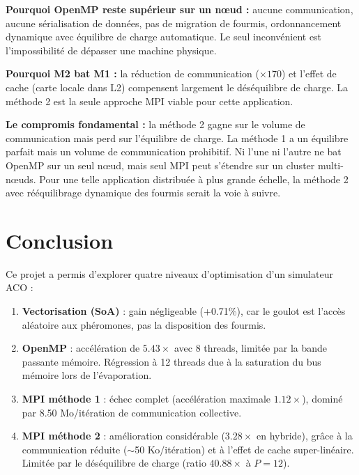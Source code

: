 \documentclass[11pt,a4paper]{article}
\begin{document}
\textbf{Pourquoi OpenMP reste supérieur sur un nœud :} aucune communication, aucune sérialisation de données, pas de migration de fourmis, ordonnancement dynamique avec équilibre de charge automatique. Le seul inconvénient est l'impossibilité de dépasser une machine physique.

\textbf{Pourquoi M2 bat M1 :} la réduction de communication ($\times 170$) et l'effet de cache (carte locale dans L2) compensent largement le déséquilibre de charge. La méthode 2 est la seule approche MPI viable pour cette application.

\textbf{Le compromis fondamental :} la méthode 2 gagne sur le volume de communication mais perd sur l'équilibre de charge. La méthode 1 a un équilibre parfait mais un volume de communication prohibitif. Ni l'une ni l'autre ne bat OpenMP sur un seul nœud, mais seul MPI peut s'étendre sur un cluster multi-nœuds. Pour une telle application distribuée à plus grande échelle, la méthode 2 avec rééquilibrage dynamique des fourmis serait la voie à suivre.

\newpage
\section*{Conclusion}

Ce projet a permis d'explorer quatre niveaux d'optimisation d'un simulateur ACO :

\begin{enumerate}[nosep]
    \item \textbf{Vectorisation (SoA)} : gain négligeable (+0.71\%), car le goulot est l'accès aléatoire aux phéromones, pas la disposition des fourmis.
    \item \textbf{OpenMP} : accélération de $5.43\times$ avec 8 threads, limitée par la bande passante mémoire. Régression à 12 threads due à la saturation du bus mémoire lors de l'évaporation.
    \item \textbf{MPI méthode 1} : échec complet (accélération maximale $1.12\times$), dominé par 8.50 Mo/itération de communication collective.
    \item \textbf{MPI méthode 2} : amélioration considérable ($3.28\times$ en hybride), grâce à la communication réduite ($\sim$50 Ko/itération) et à l'effet de cache super-linéaire. Limitée par le déséquilibre de charge (ratio $40.88 \times$ à $P=12$).
\end{enumerate}
\end{document}
